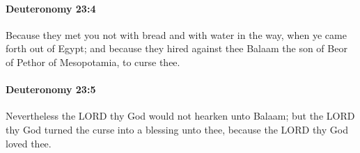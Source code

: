 		\paragraph{Deuteronomy 23:4} %
			\label{DEUTERONOMY-23-4}

			Because they met you not with bread and with water in the way, when ye came forth out of Egypt; and because they hired against thee Balaam the son of Beor of Pethor of Mesopotamia, to curse thee.


		\paragraph{Deuteronomy 23:5} %
			\label{DEUTERONOMY-23-5}

			Nevertheless the LORD thy God would not hearken unto Balaam; but the LORD thy God turned the curse into a blessing unto thee, because the LORD thy God loved thee.

